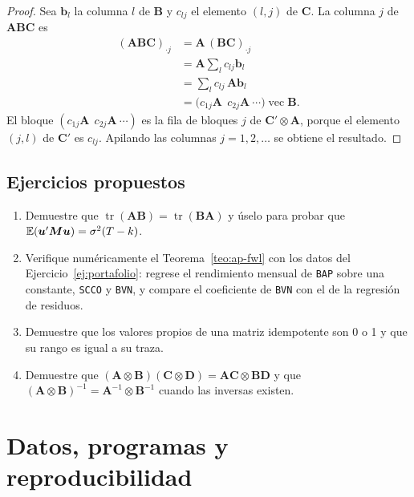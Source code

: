 \begin{proof}
Sea $\bm b_l$ la columna $l$ de $\bm B$ y $c_{lj}$ el elemento $(l,j)$ de $\bm C$. La columna $j$ de
$\bm A\bm B\bm C$ es
\begin{align*}
  (\bm A\bm B\bm C)_{\cdot j} &= \bm A\,(\bm B\bm C)_{\cdot j}\\
                              &= \bm A\sum_lc_{lj}\bm b_l\\
                              &= \sum_l c_{lj}\,\bm A\bm b_l\\
                              &= \bigl(c_{1j}\bm A\ \ c_{2j}\bm A\ \cdots\bigr)\operatorname{vec}\bm B .
\end{align*}
El bloque $(c_{1j}\bm A\ \ c_{2j}\bm A\ \cdots)$ es la fila de bloques $j$ de $\bm C'\otimes\bm A$, porque
el elemento $(j,l)$ de $\bm C'$ es $c_{lj}$. Apilando las columnas $j=1,2,\dots$ se obtiene el resultado.
\end{proof}

\section{Ejercicios propuestos}

\begin{enumerate}[label=\textbf{B.\arabic*},leftmargin=*,itemsep=6pt]
  \item Demuestre que $\operatorname{tr}(\bm A\bm B)=\operatorname{tr}(\bm B\bm A)$ y úselo para probar
        que $\mathbb{E}(\bm u'\bm M\bm u)=\sigma^2(T-k)$.
  \item Verifique numéricamente el Teorema~\ref{teo:ap-fwl} con los datos del Ejercicio~\ref{ej:portafolio}:
        regrese el rendimiento mensual de \texttt{BAP} sobre una constante, \texttt{SCCO} y \texttt{BVN},
        y compare el coeficiente de \texttt{BVN} con el de la regresión de residuos.
  \item Demuestre que los valores propios de una matriz idempotente son 0 o 1 y que su rango es igual a
        su traza.
  \item Demuestre que $(\bm A\otimes\bm B)(\bm C\otimes\bm D)=\bm A\bm C\otimes\bm B\bm D$ y que
        $(\bm A\otimes\bm B)^{-1}=\bm A^{-1}\otimes\bm B^{-1}$ cuando las inversas existen.
\end{enumerate}

\chapter{Datos, programas y reproducibilidad}\label{ap:datos}

